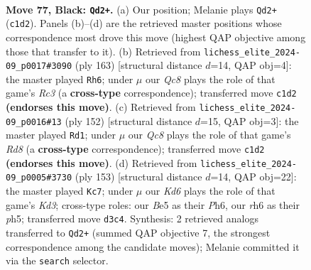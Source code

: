 \documentclass[11pt]{article}
\begin{document}
\clearpage

\begin{figure}[p]\centering
\begin{subfigure}{0.46\textwidth}\centering
\resizebox{\linewidth}{!}{%
\newchessgame
\chessboard[
  setfen={8/8/7R/4b3/8/1p1k1B2/5K2/2q5 b - - 11 77},
  showmover=false,
  pgfstyle=straightmove, color=movearrow, markmove={c1-d2}
]}
\caption{}
\end{subfigure}\hfill
\begin{subfigure}{0.46\textwidth}\centering
\resizebox{\linewidth}{!}{%
\newchessgame
\chessboard[
  setfen={5K2/5B1k/2r5/8/8/7R/8/8 b - - 28 82},
  showmover=false,
  pgfstyle=straightmove, color=movearrow, markmove={c6-h6}
]}
\caption{}
\end{subfigure}
\\[4pt]
\begin{subfigure}{0.46\textwidth}\centering
\resizebox{\linewidth}{!}{%
\newchessgame
\chessboard[
  setfen={3R4/8/8/8/2b5/2k5/8/2K3r1 w - - 50 77},
  showmover=false,
  pgfstyle=straightmove, color=movearrow, markmove={d8-d1}
]}
\caption{}
\end{subfigure}\hfill
\begin{subfigure}{0.46\textwidth}\centering
\resizebox{\linewidth}{!}{%
\newchessgame
\chessboard[
  setfen={8/1P6/3k3p/7P/6b1/8/5K2/5B2 b - - 0 77},
  showmover=false,
  pgfstyle=straightmove, color=movearrow, markmove={d6-c7}
]}
\caption{}
\end{subfigure}
\caption{\textbf{Move 77, Black: \texttt{Qd2+}.} (a) Our position; Melanie plays \texttt{Qd2+} (\texttt{c1d2}). Panels (b)--(d) are the retrieved master positions whose correspondence most drove this move (highest QAP objective among those that transfer to it). (b) Retrieved from \texttt{lichess\_elite\_2024-09\_p0017\#3090} (ply 163) [structural distance $d$=14, QAP obj=4]: the master played \texttt{Rh6}; under $\mu$ our \emph{Qc8} plays the role of that game's \emph{Rc3} (a \textbf{cross-type} correspondence); transferred move \texttt{c1d2} \textbf{(endorses this move)}. (c) Retrieved from \texttt{lichess\_elite\_2024-09\_p0016\#13} (ply 152) [structural distance $d$=15, QAP obj=3]: the master played \texttt{Rd1}; under $\mu$ our \emph{Qc8} plays the role of that game's \emph{Rd8} (a \textbf{cross-type} correspondence); transferred move \texttt{c1d2} \textbf{(endorses this move)}. (d) Retrieved from \texttt{lichess\_elite\_2024-09\_p0005\#3730} (ply 153) [structural distance $d$=14, QAP obj=22]: the master played \texttt{Kc7}; under $\mu$ our \emph{Kd6} plays the role of that game's \emph{Kd3}; cross-type roles: our \emph{B}e5 as their \emph{P}h6, our \emph{r}h6 as their \emph{p}h5; transferred move \texttt{d3c4}. Synthesis: 2 retrieved analogs transferred to \texttt{Qd2+} (summed QAP objective 7, the strongest correspondence among the candidate moves); Melanie committed it via the \texttt{search} selector.}
\label{fig:thought-m153}
\end{figure}
\end{document}
